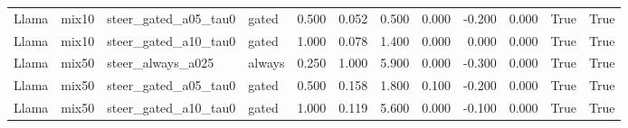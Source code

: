 \begin{tabular}{llllrrrrrrrr}
Llama & mix10 & steer_gated_a05_tau0 & gated & 0.500 & 0.052 & 0.500 & 0.000 & -0.200 & 0.000 & True & True \\
Llama & mix10 & steer_gated_a10_tau0 & gated & 1.000 & 0.078 & 1.400 & 0.000 & 0.000 & 0.000 & True & True \\
Llama & mix50 & steer_always_a025 & always & 0.250 & 1.000 & 5.900 & 0.000 & -0.300 & 0.000 & True & True \\
Llama & mix50 & steer_gated_a05_tau0 & gated & 0.500 & 0.158 & 1.800 & 0.100 & -0.200 & 0.000 & True & True \\
Llama & mix50 & steer_gated_a10_tau0 & gated & 1.000 & 0.119 & 5.600 & 0.000 & -0.100 & 0.000 & True & True \\
\bottomrule
\end{tabular}
